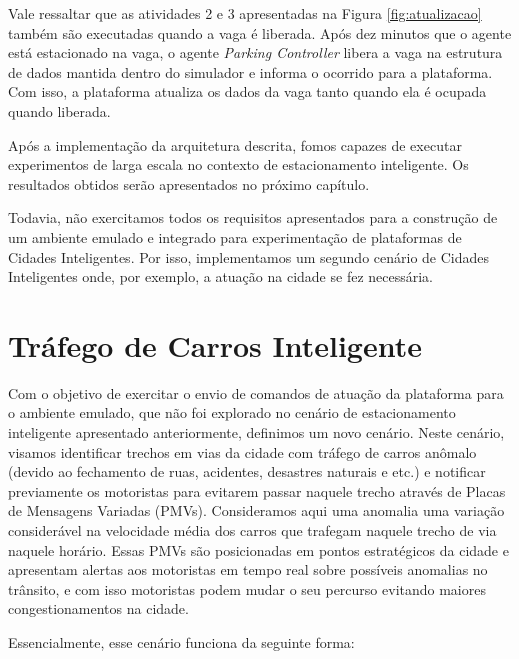 Vale ressaltar que as atividades 2 e 3 apresentadas na Figura \ref{fig:atualizacao} também são executadas quando a vaga é liberada.
Após dez minutos que o agente está estacionado na vaga, o agente \textit{Parking Controller} libera a vaga na estrutura de dados mantida dentro do simulador e informa o
ocorrido para a plataforma.
Com isso, a plataforma atualiza os dados da vaga tanto quando ela é ocupada quando liberada.

Após a implementação da arquitetura descrita, fomos capazes de executar experimentos de larga escala no contexto de estacionamento inteligente.
Os resultados obtidos serão apresentados no próximo capítulo.

Todavia, não exercitamos todos os requisitos apresentados para a construção de um ambiente emulado e integrado para experimentação de plataformas de Cidades Inteligentes.
Por isso, implementamos um segundo cenário de Cidades Inteligentes onde, por exemplo, a atuação na cidade se fez necessária.


\section{Tráfego de Carros Inteligente}

Com o objetivo de exercitar o envio de comandos de atuação da plataforma para o ambiente emulado, que não foi explorado no cenário de estacionamento inteligente apresentado
anteriormente, definimos um novo cenário.
Neste cenário, visamos identificar trechos em vias da cidade com tráfego de carros anômalo (devido ao fechamento de ruas, acidentes, desastres naturais e etc.) e notificar
previamente os motoristas para evitarem passar naquele trecho através de Placas de Mensagens Variadas (PMVs).
Consideramos aqui uma anomalia uma variação considerável na velocidade média dos carros que trafegam naquele trecho de via naquele horário.
Essas PMVs são posicionadas em pontos estratégicos da cidade e apresentam alertas aos motoristas em tempo real sobre possíveis anomalias no trânsito, e com isso motoristas
podem mudar o seu percurso evitando maiores congestionamentos na cidade.

Essencialmente, esse cenário funciona da seguinte forma:

